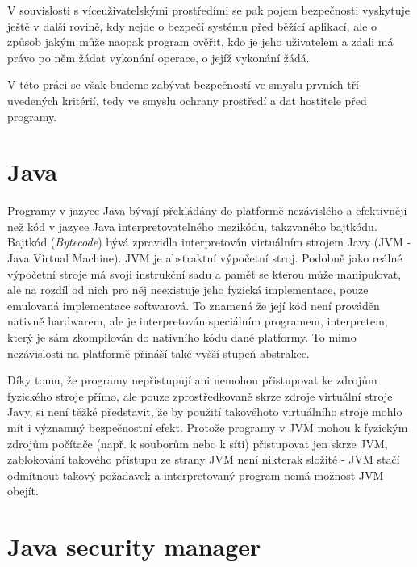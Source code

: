 V souvislosti s víceuživatelskými prostředími se pak pojem bezpečnosti vyskytuje ještě v další rovině, kdy nejde o bezpečí systému před běžící aplikací, ale o způsob jakým může naopak program ověřit, kdo je jeho uživatelem a zdali má právo po něm žádat vykonání operace, o jejíž vykonání žádá.

V této práci se však budeme zabývat bezpečností ve smyslu prvních tří uvedených kritérií, tedy ve smyslu ochrany prostředí a dat hostitele před programy.

\section{Java}

Programy v jazyce Java bývají překládány do platformě nezávislého a efektivněji než kód v jazyce Java interpretovatelného mezikódu, takzvaného bajtkódu.
Bajtkód ({\it Bytecode}) bývá zpravidla interpretován virtuálním strojem Javy (JVM - Java Virtual Machine).
JVM je abstraktní výpočetní stroj. Podobně jako reálné výpočetní stroje má svoji instrukční sadu a paměť se kterou může manipulovat, ale na rozdíl od nich pro něj neexistuje jeho fyzická implementace, pouze emulovaná implementace softwarová.
To znamená že její kód není prováděn nativně hardwarem, ale je interpretován speciálním programem, interpretem, který je sám zkompilován do nativního kódu dané platformy.
To mimo nezávislosti na platformě přináší také vyšší stupeň abstrakce.

Díky tomu, že programy nepřistupují ani nemohou přistupovat ke zdrojům fyzického stroje přímo, ale pouze zprostředkovaně skrze zdroje virtuální stroje Javy, si není těžké představit, že by použití takovéhoto virtuálního stroje mohlo mít i významný bezpečnostní efekt.
Protože programy v JVM mohou k fyzickým zdrojům počítače (např. k souborům nebo k síti) přistupovat jen skrze JVM, zablokování takového přístupu ze strany JVM není nikterak složité - JVM stačí odmítnout takový požadavek a interpretovaný program nemá možnost JVM obejít.

\section{Java security manager} \label{securityManager}

